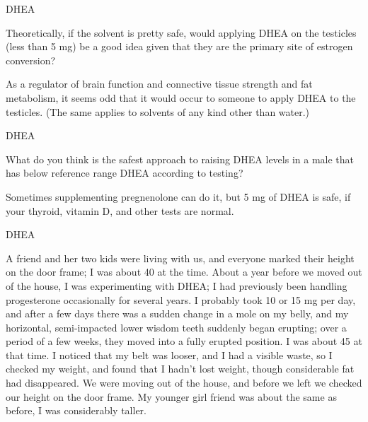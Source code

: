 \documentclass[11pt,oneside,openany,extrafontsizes]{memoir}
\begin{document}
\begin{qaexchange}{DHEA}

    \begin{question}
        Theoretically, if the solvent is pretty safe, would applying DHEA on the testicles (less than 5 mg) be a good idea given that they are the primary site of estrogen conversion?
    \end{question}

    \begin{answer}
       As a regulator of brain function and connective tissue strength and fat metabolism, it seems odd that it would occur to someone to apply DHEA to the testicles. (The same applies to solvents of any kind other than water.) 
    \end{answer}
\end{qaexchange}

\begin{qaexchange}{DHEA}

    \begin{question}
        What do you think is the safest approach to raising DHEA levels in a male that has below reference range DHEA according to testing?
    \end{question}

    \begin{answer}
      Sometimes supplementing pregnenolone can do it, but 5 mg of DHEA is safe, if your thyroid, vitamin D, and other tests are normal.
    \end{answer}
\end{qaexchange}

\begin{standalonequote}{DHEA}

    \begin{answer}
      A friend and her two kids were living with us, and everyone marked their height on the door frame; I was about 40 at the time. About a year before we moved out of the house, I was experimenting with DHEA; I had previously been handling progesterone occasionally for several years. I probably took 10 or 15 mg per day, and after a few days there was a sudden change in a mole on my belly, and my horizontal, semi-impacted lower wisdom teeth suddenly began erupting; over a period of a few weeks, they moved into a fully erupted position. I was about 45 at that time. I noticed that my belt was looser, and I had a visible waste, so I checked my weight, and found that I hadn't lost weight, though considerable fat had disappeared. We were moving out of the house, and before we left we checked our height on the door frame. My younger girl friend was about the same as before, I was considerably taller.
    \end{answer}
\end{standalonequote}
\end{document}
